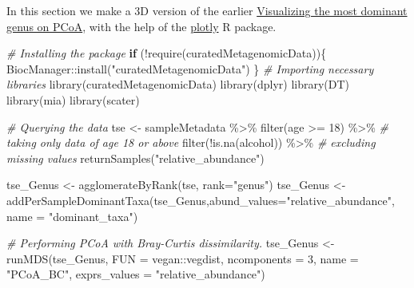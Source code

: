 \documentclass[
]{book}
\newenvironment{Shaded}{\begin{snugshade}}{\end{snugshade}}
\newcommand{\AttributeTok}[1]{\textcolor[rgb]{0.77,0.63,0.00}{#1}}
\newcommand{\CommentTok}[1]{\textcolor[rgb]{0.56,0.35,0.01}{\textit{#1}}}
\newcommand{\ControlFlowTok}[1]{\textcolor[rgb]{0.13,0.29,0.53}{\textbf{#1}}}
\newcommand{\DecValTok}[1]{\textcolor[rgb]{0.00,0.00,0.81}{#1}}
\newcommand{\FunctionTok}[1]{\textcolor[rgb]{0.00,0.00,0.00}{#1}}
\newcommand{\NormalTok}[1]{#1}
\newcommand{\OtherTok}[1]{\textcolor[rgb]{0.56,0.35,0.01}{#1}}
\newcommand{\SpecialCharTok}[1]{\textcolor[rgb]{0.00,0.00,0.00}{#1}}
\newcommand{\StringTok}[1]{\textcolor[rgb]{0.31,0.60,0.02}{#1}}
\begin{document}
In this section we make a 3D version of the earlier \href{https://microbiome.github.io/OMA/microbiome-exploration.html\#visualizing-the-most-dominant-genus-on-pcoa}{Visualizing the most dominant genus on PCoA}, with the help of the \href{https://plotly.com/r/}{plotly} R package.

\begin{Shaded}
\begin{Highlighting}[]
\CommentTok{\# Installing the package}
\ControlFlowTok{if}\NormalTok{ (}\SpecialCharTok{!}\FunctionTok{require}\NormalTok{(curatedMetagenomicData))\{}
\NormalTok{  BiocManager}\SpecialCharTok{::}\FunctionTok{install}\NormalTok{(}\StringTok{"curatedMetagenomicData"}\NormalTok{)  }
\NormalTok{\}}
\CommentTok{\# Importing necessary libraries}
\FunctionTok{library}\NormalTok{(curatedMetagenomicData)}
\FunctionTok{library}\NormalTok{(dplyr)}
\FunctionTok{library}\NormalTok{(DT)}
\FunctionTok{library}\NormalTok{(mia)}
\FunctionTok{library}\NormalTok{(scater)}

\CommentTok{\# Querying the data}
\NormalTok{tse }\OtherTok{\textless{}{-}}\NormalTok{ sampleMetadata }\SpecialCharTok{\%\textgreater{}\%}
    \FunctionTok{filter}\NormalTok{(age }\SpecialCharTok{\textgreater{}=} \DecValTok{18}\NormalTok{) }\SpecialCharTok{\%\textgreater{}\%} \CommentTok{\# taking only data of age 18 or above}
    \FunctionTok{filter}\NormalTok{(}\SpecialCharTok{!}\FunctionTok{is.na}\NormalTok{(alcohol)) }\SpecialCharTok{\%\textgreater{}\%} \CommentTok{\# excluding missing values}
    \FunctionTok{returnSamples}\NormalTok{(}\StringTok{"relative\_abundance"}\NormalTok{)}

\NormalTok{tse\_Genus }\OtherTok{\textless{}{-}} \FunctionTok{agglomerateByRank}\NormalTok{(tse, }\AttributeTok{rank=}\StringTok{"genus"}\NormalTok{)}
\NormalTok{tse\_Genus }\OtherTok{\textless{}{-}} \FunctionTok{addPerSampleDominantTaxa}\NormalTok{(tse\_Genus,}\AttributeTok{abund\_values=}\StringTok{"relative\_abundance"}\NormalTok{, }\AttributeTok{name =} \StringTok{"dominant\_taxa"}\NormalTok{)}

\CommentTok{\# Performing PCoA with Bray{-}Curtis dissimilarity.}
\NormalTok{tse\_Genus }\OtherTok{\textless{}{-}} \FunctionTok{runMDS}\NormalTok{(tse\_Genus, }\AttributeTok{FUN =}\NormalTok{ vegan}\SpecialCharTok{::}\NormalTok{vegdist, }\AttributeTok{ncomponents =} \DecValTok{3}\NormalTok{,}
              \AttributeTok{name =} \StringTok{"PCoA\_BC"}\NormalTok{, }\AttributeTok{exprs\_values =} \StringTok{"relative\_abundance"}\NormalTok{)}


\end{Highlighting}
\end{Shaded}
\end{document}
